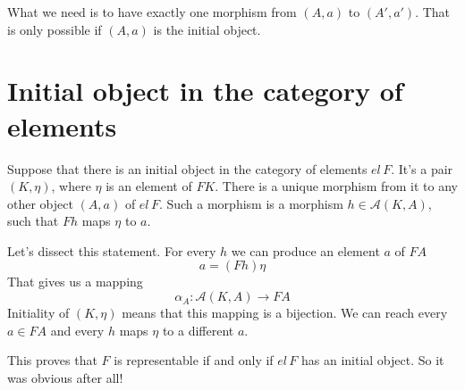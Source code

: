\documentclass[11pt]{amsart}
\newcommand{\cat}[1]{\mathcal{#1}}
\begin{document}
What we need is to have exactly one morphism from $(A, a)$ to $(A', a')$. That is only possible if $(A, a)$ is the initial object.

\section{Initial object in the category of elements}

Suppose that there is an initial object in the category of elements $el \, F$. It's a pair $(K, \eta)$, where $\eta$ is an element of $F K$. There is a unique morphism from it to any other object $(A, a)$ of $el \, F$. Such a morphism is a morphism $h \in \cat A (K, A)$, such that $F h$ maps $\eta$ to $a$. 

Let's dissect this statement. For every $h$ we can produce an element $a$ of $F A$
\[ a = (F h) \eta\]
That gives us a mapping
\[\alpha_A \colon \cat A (K, A) \to F A\]
Initiality of $(K, \eta)$ means that this mapping is a bijection. We can reach every $a \in F A$ and every $h$ maps $\eta$ to a different $a$. 

\begin{figure}[H]
\end{figure}
This proves that $F$ is representable if and only if $el \,F$ has an initial object. So it was obvious after all!
\end{document}
